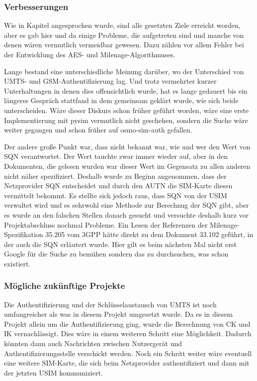 		\subsubsection{Verbesserungen}
		Wie in Kapitel  angesprochen wurde, sind alle gesetzten
		Ziele erreicht worden, aber es gab hier und da einige Probleme, die aufgetreten
		sind und manche von denen wären vermutlich vermeidbar gewesen. Dazu zählen vor
		allem Fehler bei der Entwicklung des AES- und Milenage-Algorithmuses.
		
		Lange bestand eine unterschiedliche Meinung darüber, wo der Unterschied von UMTS-
		und GSM-Authentifizierung lag. Und trotz vermehrter kurzer Unterhaltungen in
		denen dies offensichtlich wurde, hat es lange gedauert bis ein längeres Gespräch
		stattfand in dem gemeinsam geklärt wurde, wie sich beide unterscheiden. Wäre
		dieser Diskurs schon früher geführt worden, wäre eine erste Implementierung mit
		pysim vermutlich nicht geschehen, sondern die Suche wäre weiter gegangen und
		schon früher auf osmo-sim-auth gefallen.
		
		Der andere große Punkt war, dass nicht bekannt war, wie und wer den Wert von SQN
		verantwortet. Der Wert tauchte zwar immer wieder auf, aber in den Dokumenten,
		die gelesen wurden war dieser Wert im Gegensatz zu allen anderen nicht näher
		spezifiziert. Deshalb wurde zu Beginn angenommen, dass der Netzprovider SQN
		entscheidet und durch den AUTN die SIM-Karte diesen vermittelt bekommt. Es
		stellte sich jedoch raus, dass SQN von der USIM verwaltet wird und es sehrwohl
		eine Methode zur Berechnug der SQN gibt, aber es wurde an den falschen Stellen
		danach gesucht und versuchte deshalb kurz vor Projektabschluss nochmal Probleme.
		Ein Lesen der Referenzen der Milenage-Spezifikation 35.205 vom 3GPP hätte direkt
		zu dem Dokument 33.102 geführt, in der auch die SQN erläutert wurde. Hier gilt
		es beim	nächsten Mal nicht erst Google für die Suche zu bemühen sondern das zu
		durchsuchen, was schon existiert.
		
		\subsubsection{Mögliche zukünftige Projekte}
		Die Authentifizierung und der Schlüsselaustausch von UMTS ist noch umfangreicher
		als was in diesem Projekt umgesetzt wurde. Da es in diesem Projekt allein um die
		Authentifizierung ging, wurde die Berechnung von CK und IK vernachlässigt. Dies
		wäre in einem weiteren Schritt eine Möglichkeit. Dadurch könnten dann auch
		Nachrichten zwischen Nutzergerät und Authentifizierungsstelle verschickt werden.
		Noch ein Schritt weiter wäre eventuell eine weitere SIM-Karte, die sich beim
		Netzprovider authentifiziert und dann mit der jetzten USIM kommuniziert.

